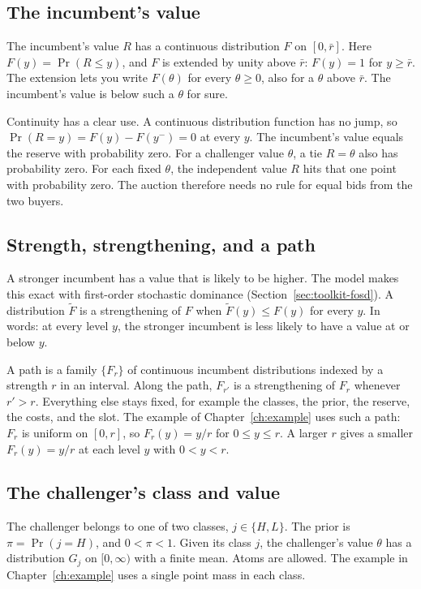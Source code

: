 \subsection*{The incumbent's value}

The incumbent's value \(R\) has a continuous distribution \(F\) on \([0,\bar r]\).
Here \(F(y)=\Pr(R\le y)\), and \(F\) is extended by unity above \(\bar r\): \(F(y)=1\) for \(y\ge\bar r\).
The extension lets you write \(F(\theta)\) for every \(\theta\ge0\), also for a \(\theta\) above \(\bar r\). The incumbent's value is below such a \(\theta\) for sure.

Continuity has a clear use.
A continuous distribution function has no jump, so \(\Pr(R=y)=F(y)-F(y^-)=0\) at every \(y\).
The incumbent's value equals the reserve with probability zero.
For a challenger value \(\theta\), a tie \(R=\theta\) also has probability zero. For each fixed \(\theta\), the independent value \(R\) hits that one point with probability zero.
The auction therefore needs no rule for equal bids from the two buyers.

\subsection*{Strength, strengthening, and a path}

A stronger incumbent has a value that is likely to be higher.
The model makes this exact with first-order stochastic dominance (Section~\ref{sec:toolkit-fosd}).
A distribution \(\tilde F\) is a strengthening of \(F\) when \(\tilde F(y)\le F(y)\) for every \(y\).
In words: at every level \(y\), the stronger incumbent is less likely to have a value at or below \(y\).

A path is a family \(\{F_r\}\) of continuous incumbent distributions indexed by a strength \(r\) in an interval.
Along the path, \(F_{r'}\) is a strengthening of \(F_r\) whenever \(r'>r\).
Everything else stays fixed, for example the classes, the prior, the reserve, the costs, and the slot.
The example of Chapter~\ref{ch:example} uses such a path: \(F_r\) is uniform on \([0,r]\), so \(F_r(y)=y/r\) for \(0\le y\le r\).
A larger \(r\) gives a smaller \(F_r(y)=y/r\) at each level \(y\) with \(0<y<r\).

\subsection*{The challenger's class and value}

The challenger belongs to one of two classes, \(j\in\{H,L\}\).
The prior is \(\pi=\Pr(j=H)\), and \(0<\pi<1\).
Given its class \(j\), the challenger's value \(\theta\) has a distribution \(G_j\) on \([0,\infty)\) with a finite mean.
Atoms are allowed. The example in Chapter~\ref{ch:example} uses a single point mass in each class.

